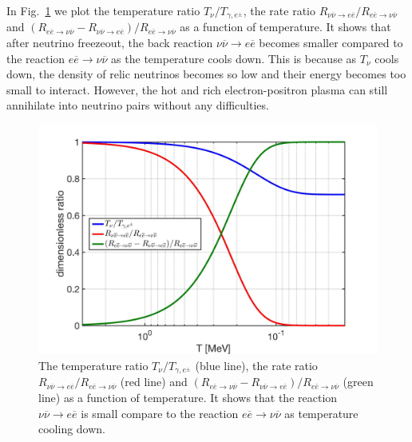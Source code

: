 In Fig.~\ref{DimensionlessRatio} we plot the temperature ratio $T_\nu/T_{\gamma,e^\pm}$, the rate ratio $R_{\nu\overline{\nu}\rightarrow e\overline{e}}/R_{e\overline{e}\rightarrow\nu\overline{\nu}}$ and $(R_{e\overline{e}\rightarrow\nu\overline{\nu}}-R_{\nu\overline{\nu}\rightarrow e\overline{e}})/R_{e\overline{e}\rightarrow\nu\overline{\nu}}$ as a function of temperature. It shows that after neutrino freezeout, the back reaction $\nu\overline{\nu}\rightarrow e\overline{e}$ becomes smaller compared to the reaction $e\overline{e}\rightarrow\nu\overline{\nu}$ as the temperature cools down. This is because as $T_\nu$ cools down, the density of relic neutrinos becomes so low and their energy becomes too small to interact. However, the hot and rich electron-positron plasma can still annihilate into neutrino pairs without any difficulties.
\begin{figure}[ht]
\begin{center}
\includegraphics[width=\textwidth]{./plots/DimensionlessRatio_ExtraNeutrino}
\caption{The temperature ratio $T_\nu/T_{\gamma,e^\pm}$ (blue line), the rate ratio $R_{\nu\overline{\nu}\rightarrow e\overline{e}}/R_{e\overline{e}\rightarrow\nu\overline{\nu}}$ (red line) and $(R_{e\overline{e}\rightarrow\nu\overline{\nu}}-R_{\nu\overline{\nu}\rightarrow e\overline{e}})/R_{e\overline{e}\rightarrow\nu\overline{\nu}}$ (green line) as a function of temperature. It shows that the reaction $\nu\overline{\nu}\rightarrow e\overline{e}$ is small compare to the reaction $e\overline{e}\rightarrow\nu\overline{\nu}$ as temperature cooling down. }
\label{DimensionlessRatio}
\end{center}
\end{figure}

